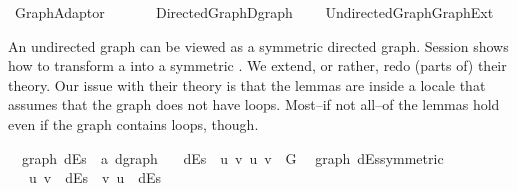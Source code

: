 %
\begin{isabellebody}%
%
%
\isadelimdocument
%
\endisadelimdocument
%
\isatagdocument
%
\isamarkuptrue%
%
\endisatagdocument
{\isafolddocument}%
%
\isadelimdocument
%
\endisadelimdocument
%
\isadelimtheory
%
\endisadelimtheory
%
\isatagtheory
{}\isamarkupfalse%
\ Graph{\isacharunderscore}{\kern0pt}Adaptor\isanewline
\ \ \isanewline
\ \ \ \ {\isachardoublequoteopen}{\isachardot}{\kern0pt}{\isachardot}{\kern0pt}{\isacharslash}{\kern0pt}Directed{\isacharunderscore}{\kern0pt}Graph{\isacharslash}{\kern0pt}Dgraph{\isachardoublequoteclose}\isanewline
\ \ \ \ {\isachardoublequoteopen}{\isachardot}{\kern0pt}{\isachardot}{\kern0pt}{\isacharslash}{\kern0pt}Undirected{\isacharunderscore}{\kern0pt}Graph{\isacharslash}{\kern0pt}Graph{\isacharunderscore}{\kern0pt}Ext{\isachardoublequoteclose}\isanewline
{}%
\endisatagtheory
{\isafoldtheory}%
%
\isadelimtheory
%
\endisadelimtheory
%
\begin{isamarkuptext}%
An undirected graph can be viewed as a symmetric directed graph. Session  shows how to
transform a  into a symmetric . We extend, or rather, redo (parts of)
their theory. Our issue with their theory is that the lemmas are inside a locale that assumes that
the graph does not have loops. Most--if not all--of the lemmas hold even if the graph contains
loops, though.%
\end{isamarkuptext}\isamarkuptrue%
\isamarkupfalse%
\ {\isacharparenleft}{\kern0pt}\ graph{\isacharparenright}{\kern0pt}\ dEs\ {\isacharcolon}{\kern0pt}{\isacharcolon}{\kern0pt}\ {\isachardoublequoteopen}{\isacharprime}{\kern0pt}a\ dgraph{\isachardoublequoteclose}\ \isanewline
\ \ {\isachardoublequoteopen}dEs\ {\isasymequiv}\ {\isacharbraceleft}{\kern0pt}{\isacharparenleft}{\kern0pt}u{\isacharcomma}{\kern0pt}\ v{\isacharparenright}{\kern0pt}{\isachardot}{\kern0pt}\ {\isacharbraceleft}{\kern0pt}u{\isacharcomma}{\kern0pt}\ v{\isacharbraceright}{\kern0pt}\ {\isasymin}\ G{\isacharbraceright}{\kern0pt}{\isachardoublequoteclose}\isanewline
\isanewline
{}\isamarkupfalse%
\ {\isacharparenleft}{\kern0pt}\ graph{\isacharparenright}{\kern0pt}\ dEs{\isacharunderscore}{\kern0pt}symmetric{\isacharcolon}{\kern0pt}\isanewline
\ \ \ {\isachardoublequoteopen}{\isacharparenleft}{\kern0pt}u{\isacharcomma}{\kern0pt}\ v{\isacharparenright}{\kern0pt}\ {\isasymin}\ dEs\ {\isasymlongleftrightarrow}\ {\isacharparenleft}{\kern0pt}v{\isacharcomma}{\kern0pt}\ u{\isacharparenright}{\kern0pt}\ {\isasymin}\ dEs{\isachardoublequoteclose}\isanewline

\end{isabellebody}
